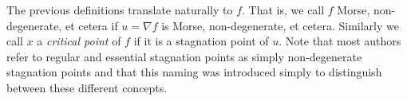 The previous definitions translate naturally to $f$.
That is, we call $f$ Morse, non-degenerate, et cetera if $u=\nabla f$ is Morse, non-degenerate, et cetera.
Similarly we call $x$ a \emph{critical point} of $f$ if it is a
stagnation point of $u$.
Note that most authors refer to regular and essential stagnation points as simply non-degenerate stagnation points
and that this naming was introduced simply to distinguish between these different concepts.

